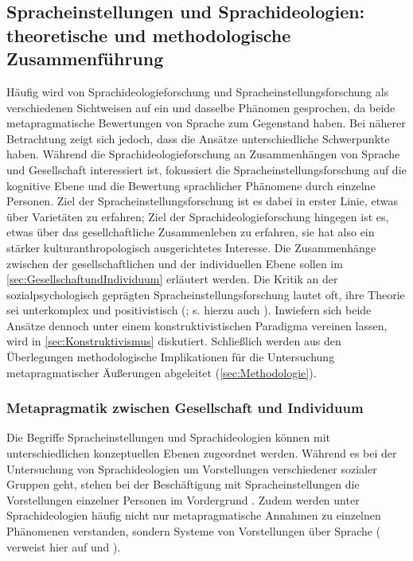 \subsection{Spracheinstellungen und Sprachideologien: theoretische und methodologische Zusammenführung}
\label{sec:Integrationsversuch}
Häufig wird von Sprachideologieforschung und Spracheinstellungsforschung als verschiedenen Sichtweisen auf ein und dasselbe Phänomen gesprochen, da beide metapragmatische Bewertungen von Sprache zum Gegenstand haben. 
Bei näherer Betrachtung zeigt sich jedoch, dass die Ansätze unterschiedliche Schwerpunkte haben. 
Während die Sprachideologieforschung an Zusammenhängen von Sprache und Gesellschaft interessiert ist, fokussiert die Spracheinstellungsforschung auf die kognitive Ebene und die Bewertung sprachlicher Phänomene durch einzelne Personen. 
Ziel der Spracheinstellungsforschung ist es dabei in erster Linie, etwas über Varietäten zu erfahren; 
Ziel der Sprachideologieforschung hingegen ist es, etwas über das gesellchaftliche Zusammenleben zu erfahren, sie hat also ein stärker kulturanthropologisch ausgerichtetes Interesse. 
Die Zusammenhänge zwischen der gesellschaftlichen und der individuellen Ebene sollen im \autoref{sec:GesellschaftundIndividuum} erläutert werden. 
Die Kritik an der sozialpsychologisch geprägten Spracheinstellungsforschung lautet oft, ihre Theorie sei unterkomplex und positivistisch (\citealp[s. etwa][141]{Agheyisi.1970}; s. hierzu auch \citealp{Soukup.2014}). 
Inwiefern sich beide Ansätze dennoch unter einem konstruktivistischen Paradigma vereinen lassen, wird in \autoref{sec:Konstruktivismus} diskutiert. 
Schließlich werden aus den Überlegungen methodologische Implikationen für die Untersuchung metapragmatischer Äußerungen abgeleitet (\autoref{sec:Methodologie}). 
\subsubsection{Metapragmatik zwischen Gesellschaft und Individuum}
\label{sec:GesellschaftundIndividuum}
Die Begriffe Spracheinstellungen und Sprachideologien können mit \citet[22]{Konig.2014} unterschiedlichen konzeptuellen Ebenen zugeordnet werden. 
Während es bei der Untersuchung von Sprachideologien um Vorstellungen verschiedener sozialer Gruppen geht, stehen bei der Beschäftigung mit Spracheinstellungen die Vorstellungen einzelner Personen im Vordergrund \citep[s.][24]{Konig.2014}.
Zudem werden unter Sprachideologien h{\"a}ufig nicht nur metapragmatische Annahmen zu einzelnen Ph{\"a}nomenen verstanden, sondern Systeme von Vorstellungen {\"u}ber Sprache (\citealp[24]{Konig.2014} verweist hier auf \citealp[970]{Gal.1995} und \citealp[35]{Irvine2000}).

